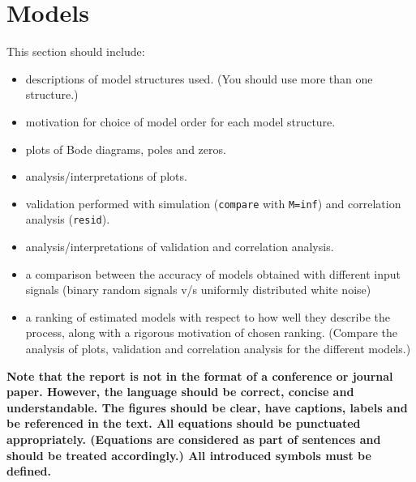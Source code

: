 \documentclass[10pt,a4paper]{article}
\begin{document}
\section{Models}
This section should include:
\begin{itemize}
    \item descriptions of model structures used. (You should use more than one structure.)
    \item motivation for choice of model order for each model structure.
    \item plots of Bode diagrams, poles and zeros.
    \item analysis/interpretations of plots.
   \item validation performed with simulation (\texttt{compare} with \texttt{M=inf}) and correlation analysis (\texttt{resid}).
   \item analysis/interpretations of validation and correlation analysis.
   \item a comparison between the accuracy of models obtained with different input signals (binary random signals v/s uniformly distributed white noise)
   \item  a ranking of estimated models with respect to how well they describe the process, along with a rigorous motivation of chosen ranking. (Compare the analysis of plots, validation and correlation analysis for the different models.)
\end{itemize}

{\bf Note that the report is not in the format of a conference or journal paper. However, the language should be correct, concise and understandable. The figures should be clear, have captions, labels and be referenced in the text. All equations should be punctuated appropriately. (Equations are considered as part of sentences and should be treated accordingly.) All introduced symbols must be defined.}
\end{document}
